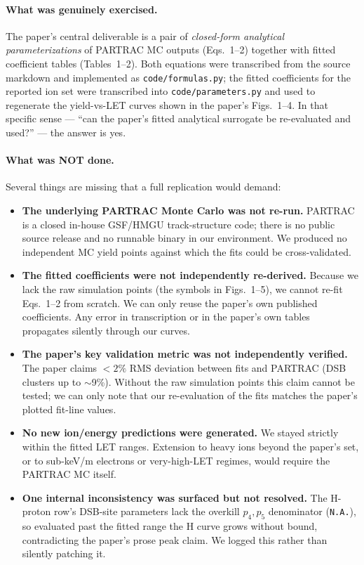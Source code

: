 \documentclass[11pt]{article}
\begin{document}
\paragraph{What was genuinely exercised.} The paper's central deliverable is a pair of \emph{closed-form analytical parameterizations} of PARTRAC MC outputs (Eqs.~1--2) together with fitted coefficient tables (Tables~1--2). Both equations were transcribed from the source markdown and implemented as \texttt{code/formulas.py}; the fitted coefficients for the reported ion set were transcribed into \texttt{code/parameters.py} and used to regenerate the yield-vs-LET curves shown in the paper's Figs.~1--4. In that specific sense --- ``can the paper's fitted analytical surrogate be re-evaluated and used?'' --- the answer is yes.

\paragraph{What was NOT done.} Several things are missing that a full replication would demand:
\begin{itemize}
  \item \textbf{The underlying PARTRAC Monte Carlo was not re-run.} PARTRAC is a closed in-house GSF/HMGU track-structure code; there is no public source release and no runnable binary in our environment. We produced no independent MC yield points against which the fits could be cross-validated.
  \item \textbf{The fitted coefficients were not independently re-derived.} Because we lack the raw simulation points (the symbols in Figs.~1--5), we cannot re-fit Eqs.~1--2 from scratch. We can only reuse the paper's own published coefficients. Any error in transcription or in the paper's own tables propagates silently through our curves.
  \item \textbf{The paper's key validation metric was not independently verified.} The paper claims $<2\%$ RMS deviation between fits and PARTRAC (DSB clusters up to $\sim$9\%). Without the raw simulation points this claim cannot be tested; we can only note that our re-evaluation of the fits matches the paper's plotted fit-line values.
  \item \textbf{No new ion/energy predictions were generated.} We stayed strictly within the fitted LET ranges. Extension to heavy ions beyond the paper's set, or to sub-keV/\textmu m electrons or very-high-LET regimes, would require the PARTRAC MC itself.
  \item \textbf{One internal inconsistency was surfaced but not resolved.} The H-proton row's DSB-site parameters lack the overkill $p_4,p_5$ denominator (\texttt{N.A.}), so evaluated past the fitted range the H curve grows without bound, contradicting the paper's prose peak claim. We logged this rather than silently patching it.
\end{itemize}
\end{document}
